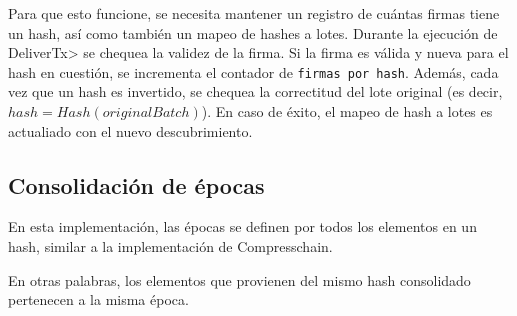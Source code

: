 Para que esto funcione, se necesita mantener un registro de cuántas firmas tiene un hash,
así como también un mapeo de hashes a lotes.
%
Durante la ejecución de \<DeliverTx> se chequea la validez de la firma.
%
Si la firma es válida y nueva para el hash en cuestión, se incrementa el contador de
\texttt{firmas por hash}.
%
Además, cada vez que un hash es invertido, se chequea la correctitud del lote original
(es decir, $hash = Hash(originalBatch)$). En caso de éxito, el mapeo de hash a lotes
es actualiado con el nuevo descubrimiento.

%


%




\subsection{Consolidación de épocas}\label{subsubsec:consolidation}

En esta implementación, las épocas se definen por todos los elementos en un hash, similar
a la implementación de Compresschain.

%
En otras palabras, los elementos que provienen del mismo hash consolidado pertenecen a la
misma época.

%
%

